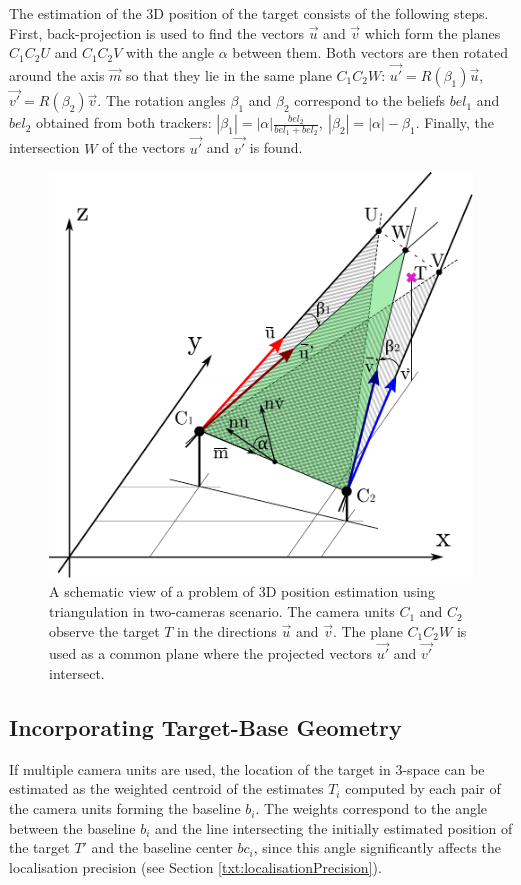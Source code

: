 The estimation of the 3D position of the target consists of the following steps. First, back-projection is used to find the vectors $\vec{u}$ and $\vec{v}$ which form the planes $C_{1}C_{2}U$ and $C_{1}C_{2}V$ with the angle $\alpha$ between them. Both vectors are then rotated around the axis $\vec{m}$ so that they lie in the same plane $C_{1}C_{2}W$: $\vec{u'} = R(\beta_{1})\vec{u}$, $\vec{v'} = R(\beta_{2})\vec{v}$. The rotation angles $\beta_{1}$ and $\beta_{2}$ correspond to the beliefs $bel_{1}$ and $bel_{2}$ obtained from both trackers: $|\beta_{1}| = |\alpha|\frac{bel_{2}}{bel_{1} + bel_{2}},~|\beta_{2}| = |\alpha| -\beta_{1}$. Finally, the intersection $W$ of the vectors $\vec{u'}$ and $\vec{v'}$ is found.

\begin{figure}[htb]\centering
	\centering
	\includegraphics[width=0.45\linewidth]{fig/triangulation.pdf}
	\caption{A schematic view of a problem of 3D position estimation using triangulation in two-cameras scenario. The camera units $C_{1}$ and $C_{2}$ observe the target $T$ in the directions $\vec{u}$ and $\vec{v}$. The plane $C_{1}C_{2}W$ is used as a common plane where the projected vectors $\vec{u'}$ and $\vec{v'}$ intersect.}
	\label{fig:triangulationSchematicView}
\end{figure}

\subsection{Incorporating Target-Base Geometry} \label{txt:incorporating_target-base_geometry}

If multiple camera units are used, the location of the target in 3-space can be estimated as the weighted centroid of the estimates $T_{i}$ computed by each pair of the camera units forming the baseline $b_{i}$. The weights correspond to the angle between the baseline $b_{i}$ and the line intersecting the initially estimated position of the target $T'$ and the baseline center $bc_{i}$, since this angle significantly affects the localisation precision (see Section \ref{txt:localisationPrecision}).

